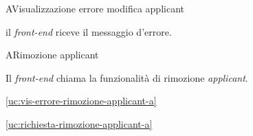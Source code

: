 \begin{usecase}{11}{A}{Visualizzazione errore modifica applicant}



	\begin{ucscenarioprincipale}
		\item il \textit{front-end} riceve il messaggio d'errore.
	\end{ucscenarioprincipale}


	\label{uc:vis-errore-mod-applicant-a}
\end{usecase}


\begin{usecase}{12}{A}{Rimozione applicant}



	\begin{ucscenarioprincipale}
		\item Il \textit{front-end} chiama la funzionalità di rimozione \textit{applicant}.
	\end{ucscenarioprincipale}


	\begin{ucestensioni}
		\item \ref{uc:vis-errore-rimozione-applicant-a}
	\end{ucestensioni}

	\begin{ucgeneralizzazioni}
		\item \ref{uc:richiesta-rimozione-applicant-a}
	\end{ucgeneralizzazioni}

	\label{uc:rimozione-applicant-a}
\end{usecase}

